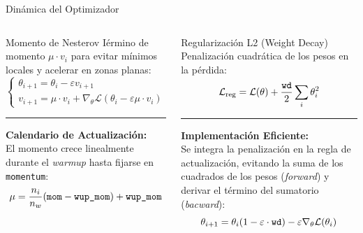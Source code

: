 \documentclass[aspectratio=169]{beamer}
\begin{document}
	\begin{frame}{Dinámica del Optimizador}
		\begin{columns}[T]
			\begin{block}{Momento de Nesterov}
				\footnotesize
				Iérmino de momento $\mu \cdot v_i$ para evitar mínimos locales y acelerar en zonas planas:
				\vspace{-0.1cm}
				\begin{equation*}
				\begin{cases}
				\theta_{i+1} = \theta_i - \varepsilon v_{i+1} \\
				v_{i+1} = \mu \cdot v_i + \nabla_{\theta}\mathcal{L}(\theta_i - \varepsilon \mu \cdot v_i)
				\end{cases}
				\end{equation*}
				
				\vspace{0.2cm}
				\hrule %
				\vspace{0.2cm}
				
				\textbf{Calendario de Actualización:} \\
				El momento crece linealmente durante el \textit{warmup} hasta fijarse en \texttt{momentum}:
				\vspace{-0.1cm}
				\begin{equation*}
				\mu = \frac{n_i}{n_w}(\text{\texttt{mom}} - \text{\texttt{wup\_mom}}) + \text{\texttt{wup\_mom}}
				\end{equation*}
			\end{block}
			
			\begin{alertblock}{Regularización L2 (Weight Decay)}
				\footnotesize
				Penalización cuadrática de los pesos en la pérdida:
				\vspace{-0.1cm}
				\begin{equation*}
				\mathcal{L}_{\text{reg}} = \mathcal{L}(\theta) + \frac{\text{\texttt{wd}}}{2}\sum_i \theta_i^2
				\end{equation*}
				
				\vspace{0.2cm}
				\hrule %
				\vspace{0.2cm}
				
				\textbf{Implementación Eficiente:} \\
				Se integra la penalización en la regla de actualización, evitando la suma de los cuadrados de los pesos (\textit{forward}) y derivar el término del sumatorio (\textit{bacward}):
				\vspace{-0.1cm}
				\begin{equation*}
				\theta_{i+1} = \theta_i (1 - \varepsilon \cdot \text{\texttt{wd}}) - \varepsilon \nabla_{\theta} \mathcal{L}(\theta_i)
				\end{equation*}
			\end{alertblock}
		\end{columns}
	\end{frame}
	
\end{document}
